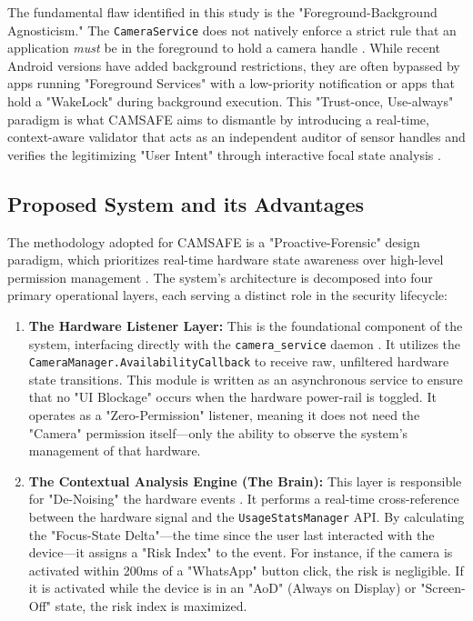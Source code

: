 \documentclass[12pt,a4paper]{report}
\begin{document}
\begin{enumerate}
    The fundamental flaw identified in this study is the "Foreground-Background Agnosticism." The \texttt{CameraService} does not natively enforce a strict rule that an application \textit{must} be in the foreground to hold a camera handle \cite{deepdroid}. While recent Android versions have added background restrictions, they are often bypassed by apps running "Foreground Services" with a low-priority notification or apps that hold a "WakeLock" during background execution. This "Trust-once, Use-always" paradigm is what CAMSAFE aims to dismantle by introducing a real-time, context-aware validator that acts as an independent auditor of sensor handles and verifies the legitimizing "User Intent" through interactive focal state analysis \cite{contextaware}.

    \subsection{Proposed System and its Advantages}
    The methodology adopted for CAMSAFE is a "Proactive-Forensic" design paradigm, which prioritizes real-time hardware state awareness over high-level permission management \cite{androidhal}. The system's architecture is decomposed into four primary operational layers, each serving a distinct role in the security lifecycle:
    \begin{enumerate}
        \item \textbf{The Hardware Listener Layer:} This is the foundational component of the system, interfacing directly with the \texttt{camera\_service} daemon \cite{androidhal}. It utilizes the \texttt{CameraManager.AvailabilityCallback} to receive raw, unfiltered hardware state transitions. This module is written as an asynchronous service to ensure that no "UI Blockage" occurs when the hardware power-rail is toggled. It operates as a "Zero-Permission" listener, meaning it does not need the "Camera" permission itself—only the ability to observe the system's management of that hardware.
        \item \textbf{The Contextual Analysis Engine (The Brain):} This layer is responsible for "De-Noising" the hardware events \cite{contextaware}. It performs a real-time cross-reference between the hardware signal and the \texttt{UsageStatsManager} API. By calculating the "Focus-State Delta"—the time since the user last interacted with the device—it assigns a "Risk Index" to the event. For instance, if the camera is activated within 200ms of a "WhatsApp" button click, the risk is negligible. If it is activated while the device is in an "AoD" (Always on Display) or "Screen-Off" state, the risk index is maximized.

\end{enumerate}
\end{enumerate}
\end{document}
